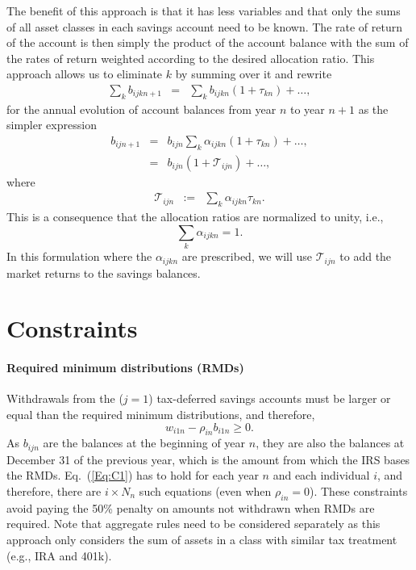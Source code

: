 \documentclass{report}[fleqn,12pt]
\begin{document}
The benefit of this approach is that it has less variables and that only the sums of
all asset classes in each savings account need to be known. The rate of return
of the account is then simply the product of the account balance with the sum of
the rates of return weighted according to the desired allocation ratio.
This approach allows us to eliminate $k$ by summing over it and rewrite
\begin{eqnarray}
	\sum_k b_{ijkn+1} &=& \sum_k b_{ijkn} (1 + \tau_{kn}) + \ldots ,
\end{eqnarray}
for the annual evolution of account balances from year $n$ to year $n+1$
as the simpler expression 
\begin{eqnarray}
	b_{ijn+1} &=& b_{ijn} \sum_k \alpha_{ijkn} (1 + \tau_{kn}) + \ldots ,\nonumber \\
		  &=& b_{ijn} (1 + \mathcal{T}_{ijn}) + \ldots ,
\end{eqnarray}
where
\begin{eqnarray}
	\label{Eq:Tau1}
	\mathcal{T}_{ijn} &:=& \sum_k \alpha_{ijkn} \tau_{kn}.
\end{eqnarray}
This is a consequence that the allocation ratios are normalized to unity, i.e.,
\begin{equation}
	\sum_k \alpha_{ijkn} = 1.
\end{equation}
In this formulation where the $\alpha_{ijkn}$ are prescribed,
we will use $\mathcal{T}_{ijn}$ to
add the market returns to the savings balances.

\section{Constraints}
\paragraph*{Required minimum distributions (RMDs)}
	Withdrawals from the ($j=1$) tax-deferred savings accounts must be larger
	or equal than the required minimum distributions, and therefore,
	\begin{equation}
		\label{Eq:C1}
		w_{i1n} -  \rho_{in}b_{i1n} \geq 0.
	\end{equation}
	As $b_{ijn}$ are the balances at the beginning of year $n$, they are also the balances
	at December 31 of the previous year, which is the amount from which the IRS bases the RMDs.
	Eq.~(\ref{Eq:C1}) has to hold for each year $n$ and each individual $i$, and therefore, there
	are $i\times N_n$ such equations (even when $\rho_{in} = 0$).
	These constraints avoid paying the 50\% penalty
	on amounts not withdrawn when RMDs are required.
	Note that aggregate rules need to be considered separately as this approach only considers
	the sum of assets in a class with similar tax treatment (e.g., IRA and 401k).
\end{document}
